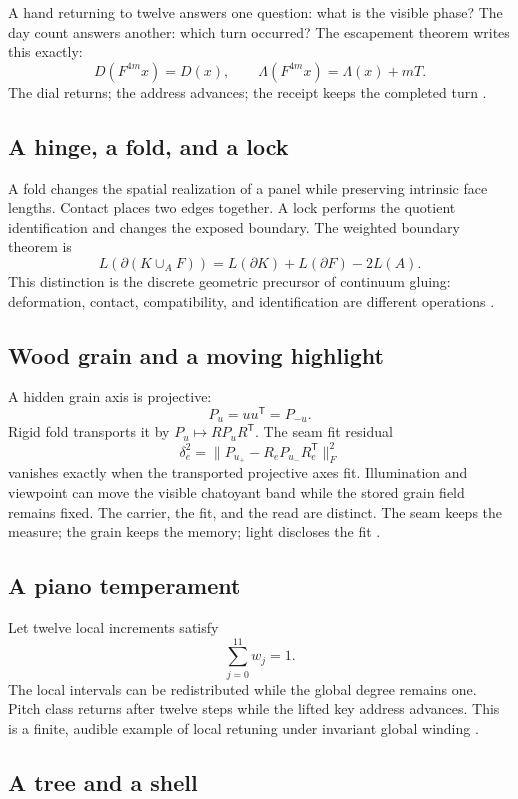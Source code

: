 \documentclass[11pt]{article}
\begin{document}
A hand returning to twelve answers one question: what is the visible phase? The day count answers another: which turn occurred? The escapement theorem writes this exactly:
\[
D(F^{4m}x)=D(x),
\qquad
\Lambda(F^{4m}x)=\Lambda(x)+mT.
\]
The dial returns; the address advances; the receipt keeps the completed turn \cite{CoppaMirrorEscapement2026}.

\subsection{A hinge, a fold, and a lock}

A fold changes the spatial realization of a panel while preserving intrinsic face lengths. Contact places two edges together. A lock performs the quotient identification and changes the exposed boundary. The weighted boundary theorem is
\[
\boxed{
L(\partial(K\cup_A F))
=
L(\partial K)+L(\partial F)-2L(A).
}
\]
This distinction is the discrete geometric precursor of continuum gluing: deformation, contact, compatibility, and identification are different operations \cite{CoppaMahogany2026}.

\subsection{Wood grain and a moving highlight}

A hidden grain axis is projective:
\[
P_u=uu^{\mathsf T}=P_{-u}.
\]
Rigid fold transports it by $P_u\mapsto RP_uR^{\mathsf T}$. The seam fit residual
\[
\delta_e^2=
\|P_{u_+}-R_eP_{u_-}R_e^{\mathsf T}\|_F^2
\]
vanishes exactly when the transported projective axes fit. Illumination and viewpoint can move the visible chatoyant band while the stored grain field remains fixed. The carrier, the fit, and the read are distinct. The seam keeps the measure; the grain keeps the memory; light discloses the fit \cite{CoppaMahogany2026}.

\subsection{A piano temperament}

Let twelve local increments satisfy
\[
\sum_{j=0}^{11}w_j=1.
\]
The local intervals can be redistributed while the global degree remains one. Pitch class returns after twelve steps while the lifted key address advances. This is a finite, audible example of local retuning under invariant global winding \cite{CoppaPianoforte2026}.

\subsection{A tree and a shell}
\end{document}
